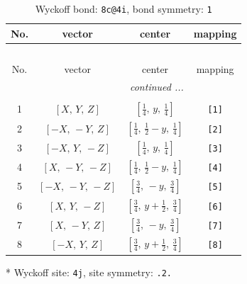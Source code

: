 \documentclass[fleqn,8pt]{jsarticle}
\begin{document}
\renewcommand{\arraystretch}{1.2}
\begin{longtable}{cccc}
\caption{Wyckoff bond: {\tt 8c@4i}, bond symmetry: {\tt 1}}
 \\
 \hline \hline
No. & vector & center & mapping \\ \hline \endfirsthead

\multicolumn{3}{l}{\tablename\ \thetable{}} \\
 \hline \hline
No. & vector & center & mapping \\ \hline \endhead

 \hline \hline
\multicolumn{3}{r}{\footnotesize\it continued ...} \\ \endfoot

 \hline \hline
\multicolumn{3}{r}{} \\ \endlastfoot

1 & $\left[ X,\, Y,\, Z \right]$ & $\left[ \frac{1}{4},\, y,\, \frac{1}{4} \right]$ & {\tt [1]} \\ \hline
2 & $\left[ - X,\, - Y,\, Z \right]$ & $\left[ \frac{1}{4},\, \frac{1}{2} - y,\, \frac{1}{4} \right]$ & {\tt [2]} \\ \hline
3 & $\left[ - X,\, Y,\, - Z \right]$ & $\left[ \frac{1}{4},\, y,\, \frac{1}{4} \right]$ & {\tt [3]} \\ \hline
4 & $\left[ X,\, - Y,\, - Z \right]$ & $\left[ \frac{1}{4},\, \frac{1}{2} - y,\, \frac{1}{4} \right]$ & {\tt [4]} \\ \hline
5 & $\left[ - X,\, - Y,\, - Z \right]$ & $\left[ \frac{3}{4},\, - y,\, \frac{3}{4} \right]$ & {\tt [5]} \\ \hline
6 & $\left[ X,\, Y,\, - Z \right]$ & $\left[ \frac{3}{4},\, y + \frac{1}{2},\, \frac{3}{4} \right]$ & {\tt [6]} \\ \hline
7 & $\left[ X,\, - Y,\, Z \right]$ & $\left[ \frac{3}{4},\, - y,\, \frac{3}{4} \right]$ & {\tt [7]} \\ \hline
8 & $\left[ - X,\, Y,\, Z \right]$ & $\left[ \frac{3}{4},\, y + \frac{1}{2},\, \frac{3}{4} \right]$ & {\tt [8]} \\
\end{longtable}
* Wyckoff site: {\tt 4j}, site symmetry: {\tt .2.}
\renewcommand{\arraystretch}{1.2}
\end{document}
